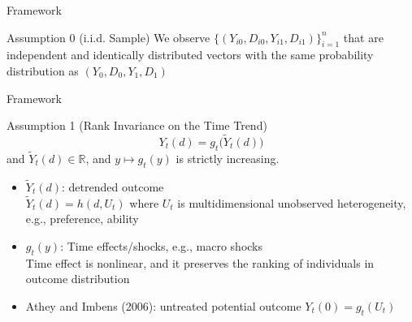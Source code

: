 \documentclass[aspectratio=1610, 9pt]{beamer}
\begin{document}
\begin{frame}{Framework}

\begin{block}{Assumption 0 (i.i.d. Sample)}
We observe $\{(Y_{i0},D_{i0},Y_{i1},D_{i1})\}_{i=1}^n$ that are independent and
identically distributed vectors with the same probability distribution as $(Y_0,D_0,Y_1,D_1)$
    
\end{block}

\end{frame}

\begin{frame}{Framework}
    \begin{block}{Assumption 1 (Rank Invariance on the Time Trend)}\label{ass:rankinvariance}
        $$Y_t(d)=g_{t}\big(\tilde{Y}_{t}(d)\big)$$ and $\tilde{Y}_{t}(d)\in\mathbb{R}$, and $y\mapsto g_{t}(y)$ is strictly increasing.
    \end{block}
    \vspace{0.6cm}
\begin{itemize}
    \item $\tilde{Y}_{t}(d)$: detrended outcome \\
    $\tilde{Y}_{t}(d)= h(d,U_t)$ where $U_t$ is multidimensional unobserved heterogeneity, e.g., preference, ability
    \item $g_t(y)$: Time effects/shocks, e.g., macro shocks \\ 
    \vspace{0.1cm}
    Time effect is nonlinear, and it preserves the ranking of individuals in outcome distribution
     \item Athey and Imbens (2006): untreated potential outcome $Y_{t}(0)=g_{t}(U_{t})$
\end{itemize}

\end{frame}
\end{document}
